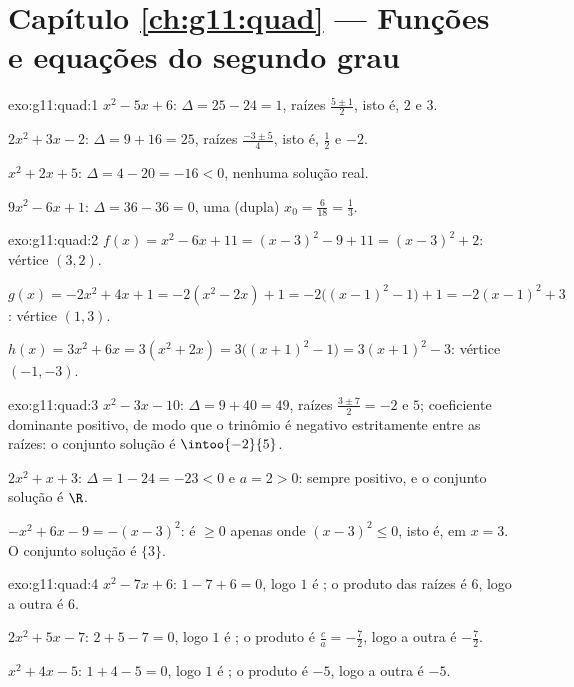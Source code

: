 \section*{Capítulo \ref{ch:g11:quad} --- Funções e equações do segundo grau}

\begin{solution}{exo:g11:quad:1}
$x^2-5x+6$: $\Delta = 25 - 24 = 1$, raízes $\frac{5 \pm 1}{2}$, isto é,
$2$ e $3$.

$2x^2+3x-2$: $\Delta = 9 + 16 = 25$, raízes $\frac{-3 \pm 5}{4}$, isto
é, $\frac12$ e $-2$.

$x^2+2x+5$: $\Delta = 4 - 20 = -16 < 0$, nenhuma solução real.

$9x^2-6x+1$: $\Delta = 36 - 36 = 0$, uma  (dupla)
$x_0 = \frac{6}{18} = \frac13$.
\end{solution}

\begin{solution}{exo:g11:quad:2}
$f(x) = x^2 - 6x + 11 = (x-3)^2 - 9 + 11 = (x-3)^2 + 2$: vértice
$(3, 2)$.

$g(x) = -2x^2+4x+1 = -2(x^2 - 2x) + 1 = -2\bigl((x-1)^2 - 1\bigr) + 1
= -2(x-1)^2 + 3$: vértice $(1, 3)$.

$h(x) = 3x^2 + 6x = 3(x^2 + 2x) = 3\bigl((x+1)^2 - 1\bigr)
= 3(x+1)^2 - 3$: vértice $(-1, -3)$.
\end{solution}

\begin{solution}{exo:g11:quad:3}
$x^2 - 3x - 10$: $\Delta = 9 + 40 = 49$, raízes
$\frac{3 \pm 7}{2} = -2$ e $5$; coeficiente dominante positivo, de modo
que o trinômio é negativo estritamente entre as raízes: o conjunto
solução é $\intoo{-2}{5}$.

$2x^2 + x + 3$: $\Delta = 1 - 24 = -23 < 0$ e $a = 2 > 0$: sempre
positivo, e o conjunto solução é $\R$.

$-x^2 + 6x - 9 = -(x-3)^2$: é $\geq 0$ apenas onde
$(x-3)^2 \leq 0$, isto é, em $x = 3$. O conjunto solução é $\{3\}$.
\end{solution}

\begin{solution}{exo:g11:quad:4}
$x^2 - 7x + 6$: $1 - 7 + 6 = 0$, logo $1$ é ; o produto das raízes é
$6$, logo a outra  é $6$.

$2x^2 + 5x - 7$: $2 + 5 - 7 = 0$, logo $1$ é ; o produto é
$\frac{c}{a} = -\frac72$, logo a outra  é $-\frac72$.

$x^2 + 4x - 5$: $1 + 4 - 5 = 0$, logo $1$ é ; o produto é $-5$, logo
a outra  é $-5$.
\end{solution}

